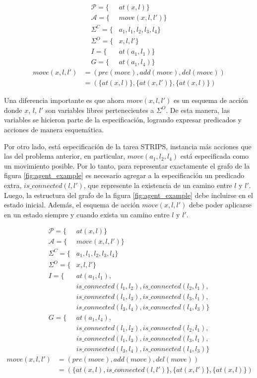 \begin{align*}
    \mathcal{P} = \{&at(x, l)\} \\
    \mathcal{A} = \{&move(x, l, l')\} \\
    \Sigma^{C} = \{&a_1, l_1, l_2, l_3, l_4\} \\
    \Sigma^{O} = \{&x, l, l'\} \\
    I = \{&at(a_1, l_1)\} \\
    G = \{&at(a_1, l_4)\}
\end{align*}
\begin{align*}
    move(x, l, l') &= (pre(move), add(move), del(move)) \\
                   &= (\{at(x, l)\}, \{at(x, l')\},\{at(x, l)\})
\end{align*}

Una diferencia importante es que ahora $move(x, l, l')$ es un esquema de acción
donde $x$, $l$, $l'$ son variables libres pertenecientes a $\Sigma^{O}$. De esta
manera, las variables se hicieron parte de la especificación, logrando expresar
predicados y acciones de manera esquemática.

Por otro lado, está especificación de la tarea STRIPS, instancia más acciones
que las del problema anterior, en particular, $move(a_1, l_2, l_4)$ está
especificada como un movimiento posible. Por lo tanto, para representar
exactamente el grafo de la figura \ref{fig:agent_example} es necesario agregar a
la especificación un predicado extra, $is\_connected(l, l')$, que represente la
existencia de un camino entre $l$ y $l'$. Luego, la estructura del grafo de la
figura \ref{fig:agent_example} debe incluirse en el estado inicial. Además, el
esquema de acción $move(x, l, l')$ debe poder aplicarse en un estado siempre y
cuando exista un camino entre $l$ y $l'$.

\begin{align*}
    \mathcal{P} = \{&at(x, l)\} \\
    \mathcal{A} = \{&move(x, l, l')\} \\
    \Sigma^{C} = \{&a_1, l_1, l_2, l_3, l_4\} \\
    \Sigma^{O} = \{&x, l, l'\} \\
    I = \{& at(a_1, l_1), \\
          & is\_connected(l_1, l_2), is\_connected(l_2, l_1), \\
          & is\_connected(l_1, l_3), is\_connected(l_3, l_1), \\
          & is\_connected(l_3, l_4), is\_connected(l_4, l_3)\} \\
    G = \{& at(a_1, l_4), \\
          & is\_connected(l_1, l_2), is\_connected(l_2, l_1), \\
          & is\_connected(l_1, l_3), is\_connected(l_3, l_1), \\
          & is\_connected(l_3, l_4), is\_connected(l_4, l_3)\}
\end{align*}
\begin{align*}
    move(x, l, l') &= (pre(move), add(move), del(move)) \\
                   &= (\{at(x, l), is\_connected(l, l')\}, \{at(x, l')\},\{at(x, l)\})
\end{align*}


